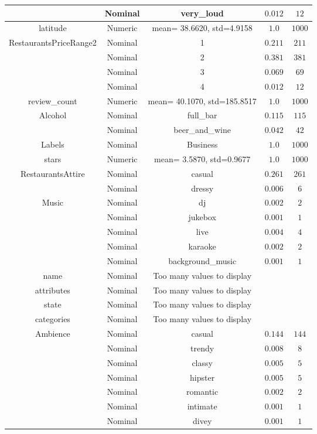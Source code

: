 \begin{tabular}{|c|c|c|c|c|}
 & Nominal & very_loud & $0.012$ & $12$ \\ \hline 
\multirow{1}{*}{latitude} & Numeric &  mean= 38.6620, std=4.9158 & $1.0$ & $1000$ \\ \hline 
\multirow{4}{*}{RestaurantsPriceRange2} & Nominal & 1 & $0.211$ & $211$ \\ \cline{2-4} 
 & Nominal & 2 & $0.381$ & $381$ \\ \cline{2-4} 
 & Nominal & 3 & $0.069$ & $69$ \\ \cline{2-4} 
 & Nominal & 4 & $0.012$ & $12$ \\ \hline 
\multirow{1}{*}{review_count} & Numeric &  mean= 40.1070, std=185.8517 & $1.0$ & $1000$ \\ \hline 
\multirow{2}{*}{Alcohol} & Nominal & full_bar & $0.115$ & $115$ \\ \cline{2-4} 
 & Nominal & beer_and_wine & $0.042$ & $42$ \\ \hline 
\multirow{1}{*}{Labels} & Nominal & Business & $1.0$ & $1000$ \\ \hline 
\multirow{1}{*}{stars} & Numeric &  mean= 3.5870, std=0.9677 & $1.0$ & $1000$ \\ \hline 
\multirow{2}{*}{RestaurantsAttire} & Nominal & casual & $0.261$ & $261$ \\ \cline{2-4} 
 & Nominal & dressy & $0.006$ & $6$ \\ \hline 
\multirow{5}{*}{Music} & Nominal & dj & $0.002$ & $2$ \\ \cline{2-4} 
 & Nominal & jukebox & $0.001$ & $1$ \\ \cline{2-4} 
 & Nominal & live & $0.004$ & $4$ \\ \cline{2-4} 
 & Nominal & karaoke & $0.002$ & $2$ \\ \cline{2-4} 
 & Nominal & background_music & $0.001$ & $1$ \\ \hline 
name & Nominal & Too many values to display & \\ \hline
attributes & Nominal & Too many values to display & \\ \hline
state & Nominal & Too many values to display & \\ \hline
categories & Nominal & Too many values to display & \\ \hline
\multirow{7}{*}{Ambience} & Nominal & casual & $0.144$ & $144$ \\ \cline{2-4} 
 & Nominal & trendy & $0.008$ & $8$ \\ \cline{2-4} 
 & Nominal & classy & $0.005$ & $5$ \\ \cline{2-4} 
 & Nominal & hipster & $0.005$ & $5$ \\ \cline{2-4} 
 & Nominal & romantic & $0.002$ & $2$ \\ \cline{2-4} 
 & Nominal & intimate & $0.001$ & $1$ \\ \cline{2-4} 
 & Nominal & divey & $0.001$ & $1$ \\ \hline 
\end{tabular}


